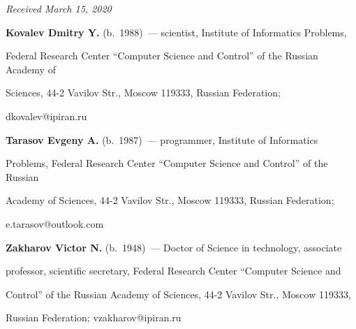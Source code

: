 




\hfill{\small\textit{Received March 15, 2020}} 










\Contr





\noindent


\textbf{Kovalev Dmitry Y.} (b.\ 1988)~--- scientist, Institute of Informatics Problems, 


Federal Research Center ``Computer Science and Control'' of the Russian Academy of 


Sciences, 44-2 Vavilov Str., Moscow 119333, Russian Federation; 


\mbox{dkovalev@ipiran.ru}





\vspace*{3pt}





\noindent


\textbf{Tarasov Evgeny A.} (b.\ 1987)~--- programmer, Institute of Informatics 


Problems, Federal Research Center ``Computer Science and Control'' of the Russian 


Academy of Sciences, 44-2 Vavilov Str., Moscow 119333, Russian Federation; 


\mbox{e.tarasov@outlook.com}





\vspace*{3pt}





\noindent


\textbf{Zakharov Victor N.} (b.\ 1948)~--- Doctor of Science in technology, associate 


professor, scientific secretary, Federal Research Center ``Computer Science and 


Control'' of the Russian Academy of Sciences, 44-2 Vavilov Str., Moscow 119333, 


Russian Federation; \mbox{vzakharov@ipiran.ru}





